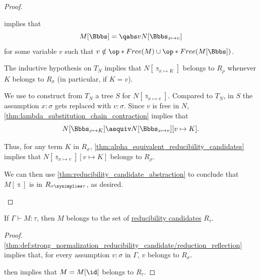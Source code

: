 \begin{proof}
\begin{itemize}
     implies that
    \begin{equation*}
      M[\Bbbs] = \qabs v N[\Bbbs_{x \mapsto v}]
    \end{equation*}
    for some variable \( v \) such that \( v \notin \op*{Free}(M) \cup \op*{Free}(M[\Bbbs]) \).

    The inductive hypothesis on \( T_N \) implies that \( N[\Bbbs_{x \mapsto K}] \) belongs to \( R_\rho \) whenever \( K \) belongs to \( R_\sigma \) (in particular, if \( K = v \)).

    We use  to construct from \( T_N \) a tree \( S \) for \( N[\Bbbs_{x \mapsto v}] \). Compared to \( T_N \), in \( S \) the assumption \( x: \sigma \) gets replaced with \( v: \sigma \). Since \( v \) is free in \( N \), \cref{thm:lambda_substitution_chain_contraction} implies that
    \begin{equation*}
      N[\Bbbs_{x \mapsto K}] \aequiv N[\Bbbs_{x \mapsto v}][v \mapsto K].
    \end{equation*}

    Thus, for any term \( K \) in \( R_\sigma \), \cref{thm:alpha_equivalent_reducibility_candidates} implies that \( N[\Bbbs_{x \mapsto v}][v \mapsto K] \) belongs to \( R_\rho \).

    We can then use \cref{thm:reducibility_candidate_abstraction} to conclude that \( M[\Bbbs] \) is in \( R_{\sigma \synimplies \tau} \), as desired.
  \end{itemize}
\end{proof}

\begin{proposition}\label{thm:reducibility_candidate_adequacy}
  If \( \Gamma \vdash M: \tau \), then \( M \) belongs to the set of \hyperref[thm:def:strong_normalization_reducibility_candidate]{reducibility candidates} \( R_\tau \).
\end{proposition}
\begin{proof}
  \ref{thm:def:strong_normalization_reducibility_candidate/reduction_reflection} implies that, for every assumption \( v: \sigma \) in \( \Gamma \), \( v \) belongs to \( R_\sigma \).

   then implies that \( M = M[\id] \) belongs to \( R_\tau \).
\end{proof}

